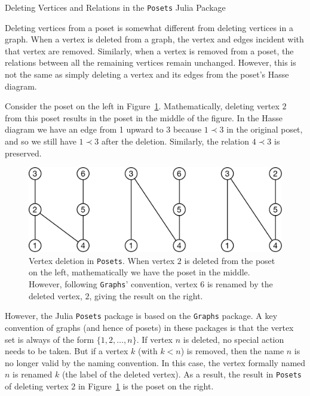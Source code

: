\documentclass[12pt]{article}
\begin{document}
\begin{center}
  \large
  Deleting Vertices and Relations in the \texttt{Posets} Julia Package
\end{center}


Deleting vertices from a poset is somewhat different from deleting
vertices in a graph. When a vertex is deleted from a graph, the vertex
and edges incident with that vertex are removed. Similarly, when
a vertex is removed from a poset, the relations between all the
remaining vertices remain unchanged. However, this is not the same as
simply deleting a vertex and its edges from the poset's Hasse
diagram. 

Consider the poset on the left in Figure~\ref{fig:vertex-deletion}. 
Mathematically, deleting vertex $2$ from this poset results in the
poset in the middle of the figure. In the Hasse diagram we have an
edge from 1 upward to 3 because $1\prec 3$ in the original poset, and
so we still have $1 \prec 3$ after the deletion. Similarly, the
relation $4\prec3$ is preserved.

\begin{figure}[h]
\begin{framed}
  \begin{center}
    \includegraphics[scale=0.4]{vertex-deletion}
  \end{center}
  \caption{Vertex deletion in \texttt{Posets}. When vertex $2$ is
    deleted from the poset on the left, mathematically we have the
    poset in the middle.  However, following \texttt{Graphs}'
    convention, vertex $6$ is renamed by the deleted vertex, $2$,
    giving the result on the right.}
  \label{fig:vertex-deletion}
\end{framed}
\end{figure}

However, the Julia \texttt{Posets} package is based on the
\texttt{Graphs} package. A key convention of graphs (and hence of
posets) in these packages is that the vertex set is always of the form
$\{1,2,\ldots,n\}$. If vertex $n$ is deleted, no special action needs
to be taken. But if a vertex $k$ (with $k<n$) is removed, then the
name $n$ is no longer valid by the naming convention. In this case,
the vertex formally named $n$ is renamed $k$ (the label of the deleted
vertex). As a result, the result in \texttt{Posets} of deleting vertex
$2$ in Figure~\ref{fig:vertex-deletion} is the poset on the right.
\end{document}
